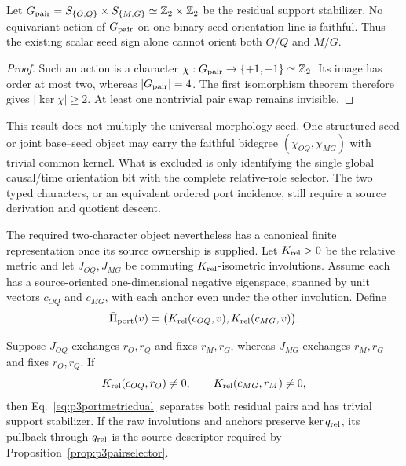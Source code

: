 \begin{proposition}
\label{prop:p3singleseedbitnogo}
Let
$G_{\rm pair}=S_{\{O,Q\}}\times S_{\{M,G\}}
\simeq\mathbb Z_2\times\mathbb Z_2$ be the residual support stabilizer.
No equivariant action of $G_{\rm pair}$ on one binary seed-orientation line
is faithful. Thus the existing scalar seed sign alone cannot orient both
$O/Q$ and $M/G$.
\end{proposition}

\begin{proof}
Such an action is a character
$\chi:G_{\rm pair}\to\{+1,-1\}\simeq\mathbb Z_2$. Its image has order at
most two, whereas $|G_{\rm pair}|=4$. The first isomorphism theorem therefore
gives $|\ker\chi|\geq2$. At least one nontrivial pair swap remains invisible.
\end{proof}

This result does not multiply the universal morphology seed. One structured
seed or joint base--seed object may carry the faithful bidegree
$(\chi_{OQ},\chi_{MG})$ with trivial common kernel. What is excluded is only
identifying the single global causal/time orientation bit with the complete
relative-role selector. The two typed characters, or an equivalent ordered
port incidence, still require a source derivation and quotient descent.

The required two-character object nevertheless has a canonical finite
representation once its source ownership is supplied. Let $K_{\rm rel}>0$
be the relative metric and let $J_{OQ},J_{MG}$ be commuting
$K_{\rm rel}$-isometric involutions. Assume each has a source-oriented
one-dimensional negative eigenspace, spanned by unit vectors $c_{OQ}$ and
$c_{MG}$, with each anchor even under the other involution. Define
\begin{equation}
 \bar\Pi_{\rm port}(v)=
 \bigl(K_{\rm rel}(c_{OQ},v),K_{\rm rel}(c_{MG},v)\bigr).
 \label{eq:p3portmetricdual}
\end{equation}

\begin{proposition}
\label{prop:p3portrepresentation}
Suppose $J_{OQ}$ exchanges $r_O,r_Q$ and fixes $r_M,r_G$, whereas
$J_{MG}$ exchanges $r_M,r_G$ and fixes $r_O,r_Q$. If
\begin{equation}
 K_{\rm rel}(c_{OQ},r_O)\ne0,
 \qquad K_{\rm rel}(c_{MG},r_M)\ne0,
 \label{eq:p3portnonzero}
\end{equation}
then Eq.~\eqref{eq:p3portmetricdual} separates both residual pairs and has
trivial support stabilizer. If the raw involutions and anchors preserve
$\ker q_{\rm rel}$, its pullback through $q_{\rm rel}$ is the source
descriptor required by Proposition~\ref{prop:p3pairselector}.
\end{proposition}

